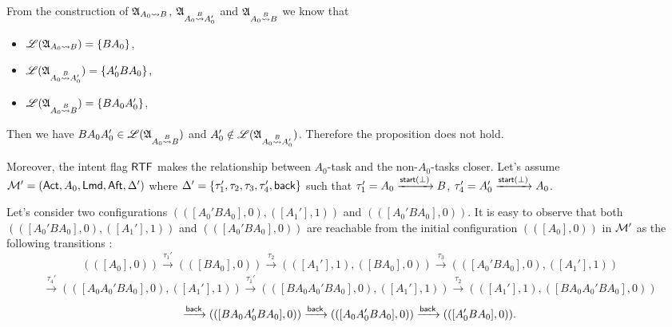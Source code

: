 {\begin{example}
From the construction of ${\mathfrak{A} }_{A_0\rightsquigarrow B}$, ${\mathfrak{A} }_{A_0\stackrel{B}\rightsquigarrow A_0'}$ and ${\mathfrak{A} }_{A_0\stackrel{B}\rightsquigarrow B}$ we know that 
\begin{itemize}
    \item ${\mathscr{L} }({\mathfrak{A} }_{A_0\rightsquigarrow B}) = \{BA_0\}$, 
    \item ${\mathscr{L} }({\mathfrak{A} }_{A_0\stackrel{B}\rightsquigarrow A_0'}) = \{A_0'BA_0\}$, 
    \item ${\mathscr{L} }({\mathfrak{A} }_{A_0\stackrel{B}\rightsquigarrow B}) = \{BA_0 A_0'\}$, 

\end{itemize}
Then we have $BA_0 A_0' \in {\mathscr{L} }({\mathfrak{A} }_{A_0\stackrel{B}\rightsquigarrow B})$ and $A_0' \notin {\mathscr{L} }({\mathfrak{A} }_{A_0\stackrel{B}\rightsquigarrow A_0'})$. Therefore the proposition does not hold.

Moreover, the intent flag ${\sf RTF}$ makes the relationship between $A_0$-task and the non-$A_0$-tasks closer. Let's assume ${\mathcal{M} }' = ({\sf Act}, A_0,{\sf Lmd},{\sf Aft},\Delta')$ where $\Delta' = \{\tau_1',\tau_2,\tau_3,\tau_4',{\mathsf{back} }\}$ such that $\tau_1' = A_0\xrightarrow{{\mathsf{start} }(\bot)}B$, $\tau_4' = A_0'\xrightarrow{{\mathsf{start} }(\bot)}A_0$.

Let's consider two configurations $(([A_0'BA_0],0),([A_1'],1))$ and $(([A_0'BA_0],0))$. It is easy to observe that both $(([A_0'BA_0],0),([A_1'],1))$ and $(([A_0'BA_0],0))$ are reachable from the initial configuration $(([A_0],0))$ in ${\mathcal{M} }'$ as the following transitions :
$$(([A_0],0)) \xrightarrow[]{\tau_1'}(([BA_0],0)) \xrightarrow[]{\tau_2}(([A_1'],1),([BA_0],0))\xrightarrow[]{\tau_3}(([A_0'BA_0],0),([A_1'],1))$$
$$\xrightarrow[]{\tau_4'}(([A_0A_0'BA_0],0),([A_1'],1)) \xrightarrow[]{\tau_1'}(([BA_0A_0'BA_0],0),([A_1'],1))\xrightarrow[]{\tau_2}(([A_1'],1),([BA_0A_0'BA_0],0))$$
$$ \xrightarrow[]{{\mathsf{back} }}(([BA_0A_0'BA_0],0))\xrightarrow[]{{\mathsf{back} }}(([A_0A_0'BA_0],0))\xrightarrow[]{{\mathsf{back} }}(([A_0'BA_0],0)).$$


\end{example}}
